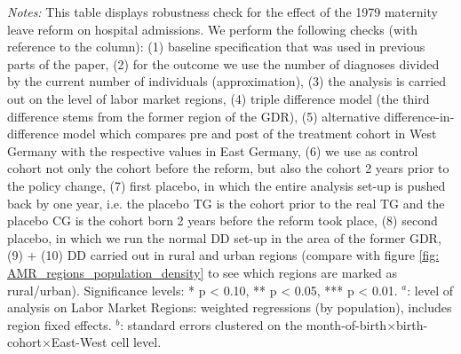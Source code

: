 \begin{landscape}
\begin{table}[htbp]
\begin{minipage}{0.87\linewidth}
		\scriptsize \emph{Notes:} This table displays robustness check for the effect of the 1979 maternity leave reform on hospital admissions. We perform the following checks (with reference to the column): (1) baseline specification that was used in previous parts of the paper, (2) for the outcome we use the number of diagnoses divided by the current number of individuals (approximation), (3) the analysis is carried out on the level of labor market regions, (4) triple difference model (the third difference stems from the former region of the GDR), (5) alternative difference-in-difference model which compares pre and post of the treatment cohort in West Germany with the respective values in East Germany, (6) we use as control cohort not only the cohort before the reform, but also the cohort 2 years prior to the policy change, (7) first placebo, in which the entire analysis set-up is pushed back by one year, i.e. the placebo TG is the cohort prior to the real TG and the placebo CG is the cohort born 2 years before the reform took place, (8) second placebo, in which we run the normal DD set-up in the area of the former GDR, (9) + (10)  DD carried out in rural and urban regions (compare with figure \ref{fig: AMR_regions_population_density} to see which regions are marked as rural/urban). \newline Significance levels: * p < 0.10, ** p < 0.05, *** p < 0.01. \newline
		\hspace*{15 pt}$^a$: level of analysis on Labor Market Regions: weighted regressions (by population), includes region fixed effects.\newline
		\hspace*{15 pt}$^b$: standard errors clustered on the month-of-birth$\times$birth-cohort$\times$East-West cell level.
	\end{minipage}
\end{table} 
	\vspace*{\fill}\clearpage
\end{landscape}






